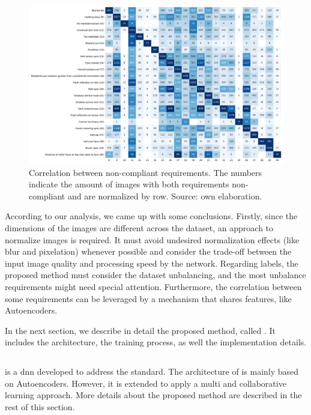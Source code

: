 \begin{figure}
\centering
\includegraphics[width=\linewidth]{images/reqs_correlation.pdf}
\caption{Correlation between non-compliant requirements. The numbers indicate the amount of images with both requirements non-compliant and are normalized by row. Source: own elaboration.}
\label{fig:reqs_correlation}
\end{figure}

According to our analysis, we came up with some conclusions. Firstly, since the dimensions of the images are different across the dataset, an approach to normalize images is required. It must avoid undesired normalization effects (like blur and pixelation) whenever possible and consider the trade-off between the input image quality and processing speed by the network. Regarding labels, the proposed method must consider the dataset unbalancing, and the most unbalance requirements might need special attention. Furthermore, the correlation between some requirements can be leveraged by a mechanism that shares features, like Autoencoders.

In the next section, we describe in detail the proposed method, called \methodname. It includes the architecture, the training process, as well the implementation details.

\subsection{\methodname}

\methodname is a \acl{dnn} developed to address the \icao standard. The architecture of \methodname is mainly based on Autoencoders. However, it is extended to apply a multi and collaborative learning approach. More details about the proposed method are described in the rest of this section. 

